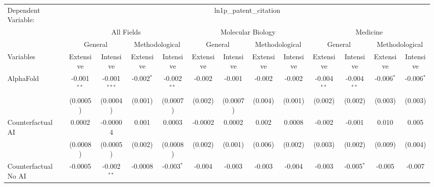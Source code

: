 \begingroup
\centering
\begin{tabular}{lcccccccccccc}
   \tabularnewline \midrule \midrule
   Dependent Variable: & \multicolumn{12}{c}{ln1p\_patent\_citation}\\
 & \multicolumn{4}{c}{All Fields} & \multicolumn{4}{c}{Molecular Biology} & \multicolumn{4}{c}{Medicine} \\
\cmidrule(lr){2-5} \cmidrule(lr){6-9} \cmidrule(lr){10-13}
 & \multicolumn{2}{c}{General} & \multicolumn{2}{c}{Methodological} & \multicolumn{2}{c}{General} & \multicolumn{2}{c}{Methodological} & \multicolumn{2}{c}{General} & \multicolumn{2}{c}{Methodological} \\
\cmidrule(lr){2-3} \cmidrule(lr){4-5} \cmidrule(lr){6-7} \cmidrule(lr){8-9} \cmidrule(lr){10-11} \cmidrule(lr){12-13}
Variables & \multicolumn{1}{c}{Extensive} & \multicolumn{1}{c}{Intensive} & \multicolumn{1}{c}{Extensive} & \multicolumn{1}{c}{Intensive} & \multicolumn{1}{c}{Extensive} & \multicolumn{1}{c}{Intensive} & \multicolumn{1}{c}{Extensive} & \multicolumn{1}{c}{Intensive} & \multicolumn{1}{c}{Extensive} & \multicolumn{1}{c}{Intensive} & \multicolumn{1}{c}{Extensive} & \multicolumn{1}{c}{Intensive} \\
\cmidrule(lr){1-1}\cmidrule(lr){2-2} \cmidrule(lr){3-3} \cmidrule(lr){4-4} \cmidrule(lr){5-5} \cmidrule(lr){6-6} \cmidrule(lr){7-7} \cmidrule(lr){8-8} \cmidrule(lr){9-9} \cmidrule(lr){10-10} \cmidrule(lr){11-11} \cmidrule(lr){12-12} \cmidrule(lr){13-13}
   AlphaFold                                & -0.001$^{**}$ & -0.001$^{***}$ & -0.002$^{*}$ & -0.002$^{**}$ & -0.002  & -0.001   & -0.002  & -0.002   & -0.004$^{**}$ & -0.004$^{**}$ & -0.006$^{*}$ & -0.006$^{*}$\\   
                                            & (0.0005)      & (0.0004)       & (0.001)      & (0.0007)      & (0.002) & (0.0007) & (0.004) & (0.001)  & (0.002)       & (0.002)       & (0.003)      & (0.003)\\   
   Counterfactual AI                        & 0.0002        & -0.00004       & 0.001        & 0.0003        & -0.0002 & 0.0002   & 0.002   & 0.0008   & -0.002        & -0.001        & 0.010        & 0.005\\   
                                            & (0.0008)      & (0.0005)       & (0.002)      & (0.0008)      & (0.002) & (0.001)  & (0.006) & (0.002)  & (0.003)       & (0.002)       & (0.009)      & (0.004)\\   
   Counterfactual No AI                     & -0.0005       & -0.002$^{**}$  & -0.0008      & -0.003$^{*}$  & -0.004  & -0.003   & -0.003  & -0.004   & -0.003        & -0.005$^{*}$  & -0.005       & -0.007\\   

\end{tabular}
